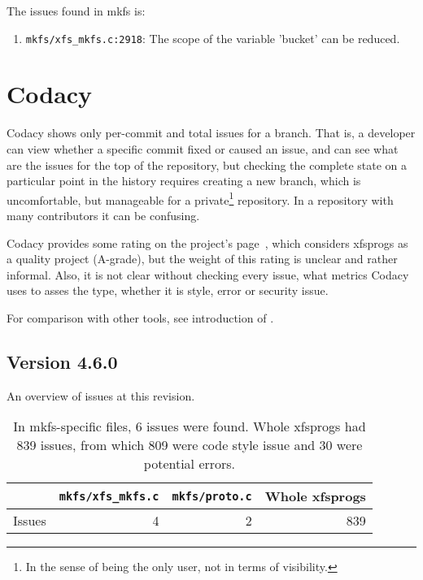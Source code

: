 The issues found in mkfs is:
\begin{enumerate}
	\item {\tt mkfs/xfs\_mkfs.c:2918}: The scope of the variable 'bucket' can be reduced.
\end{enumerate}



\section{Codacy}\label{chap:results:codacy}
Codacy shows only per-commit and total issues for a branch. That is, a
developer can view whether a specific commit fixed or caused an issue, and
can see what are the issues for the top of the repository, but checking the
complete state on a particular point in the history requires creating a new
branch, which is uncomfortable, but manageable for a private\footnote{In
the sense of being the only user, not in terms of visibility.} repository.
In a repository with many contributors it can be confusing.

Codacy provides some rating on the project's page~\cite{codacyXfsprogs},
which considers xfsprogs as a quality project (A-grade), but the weight of
this rating is unclear and rather informal. Also, it is not clear without
checking every issue, what metrics Codacy uses to asses the type, whether
it is style, error or security issue.

For comparison with other tools, see introduction of .

\subsection{Version 4.6.0}\label{chap:results:codacy:4.6}

An overview of issues at this revision.
\begin{table}[h]
\begin{tabular}{|l||r|r||r|}
\hline
& {\tt mkfs/xfs\_mkfs.c} & {\tt mkfs/proto.c} & Whole xfsprogs \\
\hline
Issues & 4 & 2 & 839 \\
\hline
\end{tabular}
\caption{In mkfs-specific files, 6 issues were found. Whole
xfsprogs had 839 issues, from which 809 were code style issue and 30 were
potential errors.}
\end{table}

